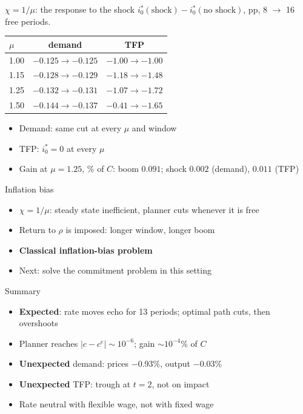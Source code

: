 \documentclass[aspectratio=169,11pt]{beamer}
\newcommand{\hl}[1]{{\color{mblue}\textbf{#1}}}
\begin{document}
\begin{frame}{$\chi=1/\mu$: the response to the shock}
  $i^*_0(\text{shock})-i^*_0(\text{no shock})$, pp, 8 $\to$ 16 free periods.

  \medskip
  \centering
  \begin{tabular}{lcc}
    \toprule
    $\mu$ & demand & TFP\\
    \midrule
    1.00 & $-0.125\to-0.125$ & $-1.00\to-1.00$\\
    1.15 & $-0.128\to-0.129$ & $-1.18\to-1.48$\\
    1.25 & $-0.132\to-0.131$ & $-1.07\to-1.72$\\
    1.50 & $-0.144\to-0.137$ & $-0.41\to-1.65$\\
    \bottomrule
  \end{tabular}

  \bigskip
  \raggedright
  \begin{itemize}
    \item Demand: same cut at every $\mu$ and window
    \item TFP: $i^*_0=0$ at every $\mu$
    \item Gain at $\mu=1.25$, \% of $C$: boom $0.091$; shock $0.002$ (demand), $0.011$ (TFP)
  \end{itemize}
\end{frame}

\begin{frame}{Inflation bias}
  \begin{itemize}\setlength{\itemsep}{0.9em}
    \item $\chi=1/\mu$: steady state inefficient, planner cuts whenever it is free
    \item Return to $\rho$ is imposed: longer window, longer boom
    \item \hl{Classical inflation-bias problem}
    \item Next: solve the commitment problem in this setting
  \end{itemize}
\end{frame}

\begin{frame}{Summary}
  \begin{itemize}\setlength{\itemsep}{0.9em}
    \item \hl{Expected}: rate moves echo for 13 periods; optimal path cuts, then overshoots
    \item Planner reaches $|c-c^e|\sim10^{-6}$; gain $\sim10^{-4}\%$ of $C$
    \item \hl{Unexpected} demand: prices $-0.93\%$, output $-0.03\%$
    \item \hl{Unexpected} TFP: trough at $t=2$, not on impact
    \item Rate neutral with flexible wage, not with fixed wage
  \end{itemize}
\end{frame}
\end{document}
